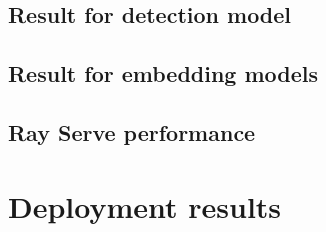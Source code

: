 \documentclass[../main.tex]{subfiles}
\begin{document}
\subsection{Result for detection model}
\label{sec:detection_experiments}


\subsection{Result for embedding models}
\label{sec:embedding_experiments}


% 

\subsection{Ray Serve performance}
\label{sec:ray_serve_performance}


\section{Deployment results}
\label{sec:deployment_results}

\end{document}
